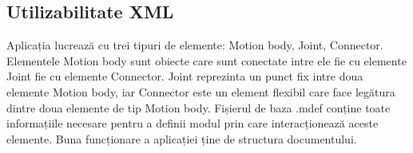 \subsection{Utilizabilitate XML}
Aplicația lucrează cu trei tipuri de elemente: Motion body, Joint, Connector. 
Elementele Motion body sunt obiecte care sunt conectate intre ele fie cu elemente Joint fie cu elemente Connector. 
Joint reprezinta un punct fix intre doua elemente Motion body, iar Connector este un element flexibil care face legătura dintre doua
elemente de tip Motion body. Fișierul de baza .mdef conține toate informațiile necesare pentru a definii modul prin care interacționează
aceste elemente. Buna funcționare a aplicației ține de structura documentului.

